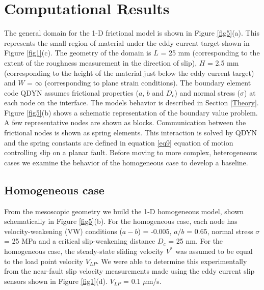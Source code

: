 \documentclass[final,3p, 11pt,authoryear]{elsarticle}
\begin{document}
\section{Computational Results}

The general domain for the 1-D frictional model is shown in Figure \ref{fig5}(a). This represents the small region of material under the eddy current target shown in Figure \ref{fig1}(c). The geometry of the domain is $L$ = 25 mm (corresponding to the extent of the roughness measurement in the direction of slip), $H$ = 2.5 mm (corresponding to the height of the material just below the eddy current target) and $W$ = $\infty$ (corresponding to plane strain conditions). The boundary element code QDYN assumes frictional properties ($a$, $b$ and $D_{c}$) and normal stress ($\sigma$) at each node on the interface. The models behavior is described in Section \ref{Theory}. Figure \ref{fig5}(b) shows a schematic representation of the boundary value problem. A few representative nodes are shown as blocks. Communication between the frictional nodes is shown as spring elements. This interaction is solved by QDYN  and the spring constants are defined in equation \eqref{eq9} equation of motion controlling slip on a planar fault. Before moving to more complex, heterogeneous cases we examine the behavior of the homogeneous case to develop a baseline.    

\subsection{Homogeneous case}

From the mesoscopic geometry we build the 1-D homogeneous model, shown schematically in Figure \ref{fig5}(b). For the homogeneous case, each node has velocity-weakening (VW) conditions ($a-b$) = -0.005, $a/b$ = 0.65, normal stress $\sigma$ = 25 MPa and a critical slip-weakening distance $D_{c}$ = 25 nm. For the homogeneous case, the steady-state sliding velocity $V^{*}$ was assumed to be equal to the load point velocity $V_{LP}$. We were able to determine this experimentally from the near-fault slip velocity measurements made using the eddy current slip sensors shown in Figure \ref{fig1}(d). $V_{LP}$ = 0.1 $\mu$m/s.
\end{document}
